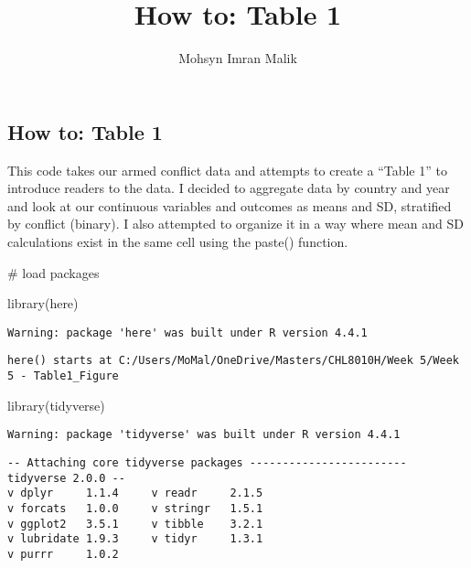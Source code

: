 \documentclass[
  letterpaper,
  DIV=11,
  numbers=noendperiod]{scrartcl}
\title{How to: Table 1}
\author{Mohsyn Imran Malik}
\date{}
\newenvironment{Shaded}{\begin{snugshade}}{\end{snugshade}}
\newcommand{\CommentTok}[1]{\textcolor[rgb]{0.37,0.37,0.37}{#1}}
\newcommand{\FunctionTok}[1]{\textcolor[rgb]{0.28,0.35,0.67}{#1}}
\newcommand{\NormalTok}[1]{\textcolor[rgb]{0.00,0.23,0.31}{#1}}
\begin{document}
\maketitle


\subsection{How to: Table 1}\label{how-to-table-1}

This code takes our armed conflict data and attempts to create a ``Table
1'' to introduce readers to the data. I decided to aggregate data by
country and year and look at our continuous variables and outcomes as
means and SD, stratified by conflict (binary). I also attempted to
organize it in a way where mean and SD calculations exist in the same
cell using the paste() function.

\begin{Shaded}
\begin{Highlighting}[]
\CommentTok{\# load packages}

\FunctionTok{library}\NormalTok{(here)}
\end{Highlighting}
\end{Shaded}

\begin{verbatim}
Warning: package 'here' was built under R version 4.4.1
\end{verbatim}

\begin{verbatim}
here() starts at C:/Users/MoMal/OneDrive/Masters/CHL8010H/Week 5/Week 5 - Table1_Figure
\end{verbatim}

\begin{Shaded}
\begin{Highlighting}[]
\FunctionTok{library}\NormalTok{(tidyverse)}
\end{Highlighting}
\end{Shaded}

\begin{verbatim}
Warning: package 'tidyverse' was built under R version 4.4.1
\end{verbatim}

\begin{verbatim}
-- Attaching core tidyverse packages ------------------------ tidyverse 2.0.0 --
v dplyr     1.1.4     v readr     2.1.5
v forcats   1.0.0     v stringr   1.5.1
v ggplot2   3.5.1     v tibble    3.2.1
v lubridate 1.9.3     v tidyr     1.3.1
v purrr     1.0.2     
\end{verbatim}
\end{document}
